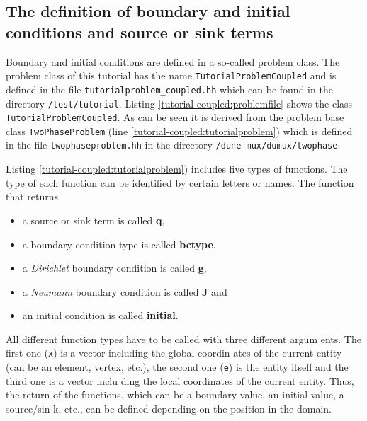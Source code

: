 \subsection{The definition of boundary and initial conditions and source or sink terms}\label{tutorial-coupled:description-bc-ic}

Boundary and initial conditions are defined in a so-called problem class. The problem class of this tutorial has the name \texttt{TutorialProblemCoupled} and is defined in the file \texttt{tutorialproblem\_coupled.hh} which can be found in the directory \texttt{/test/tutorial}. Listing \ref{tutorial-coupled:problemfile} shows the class \texttt{TutorialProblemCoupled}. As can be seen it is derived from the problem base class \texttt{TwoPhaseProblem} (line \ref{tutorial-coupled:tutorialproblem}) which is defined in the file \texttt{twophaseproblem.hh} in the directory \texttt{/dune-mux/dumux/twophase}.

\begin{lst}\label{tutorial-coupled:problemfile} \mbox{}

\end{lst}

Listing \ref{tutorial-coupled:tutorialproblem}) includes five types of functions. The type of each function can be identified by certain letters or names. The function that returns
\begin{itemize}
 \item a source or sink term is called \textbf{q},
 \item a boundary condition type is called \textbf{bctype},
 \item a \textit{Dirichlet} boundary condition is called \textbf{g},
 \item a \textit{Neumann} boundary condition is called \textbf{J} and
 \item an initial condition is called \textbf{initial}.
\end{itemize}

All different function types have to be called with three different argum
ents. The first one (\texttt{x}) is a vector including the global coordin
ates of the current entity (can be an element, vertex, etc.), the second
one (\texttt{e}) is the entity itself and the third one is a vector inclu
ding the local coordinates of the current entity. Thus, the return of the
 functions, which can be a boundary value, an initial value, a source/sin
k, etc., can be defined depending on the position in the domain.

